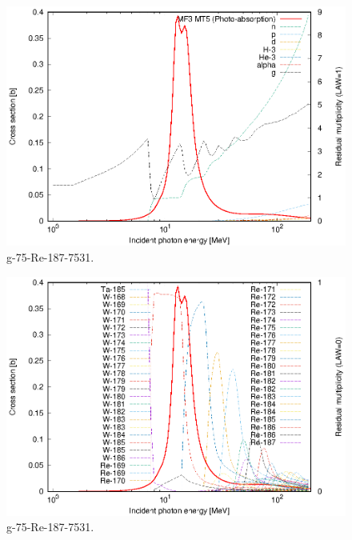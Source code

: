 \begin{figure}
 \includegraphics[width=\linewidth]{eps/g_75-Re-187_7531.eps}
  \caption{g-75-Re-187-7531.}
\end{figure}
\begin{figure}
 \includegraphics[width=\linewidth]{eps-law0/g_75-Re-187_7531.eps}
 \caption{g-75-Re-187-7531.}
\end{figure}
\newpage \clearpage

